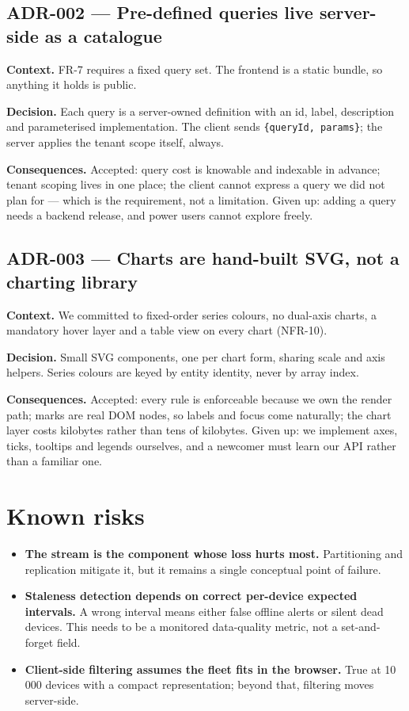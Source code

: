 \documentclass[11pt,a4paper]{article}
\begin{document}
\subsection*{ADR-002 --- Pre-defined queries live server-side as a catalogue}

\textbf{Context.} FR-7 requires a fixed query set. The frontend is a static bundle, so
anything it holds is public.

\textbf{Decision.} Each query is a server-owned definition with an id, label,
description and parameterised implementation. The client sends
\texttt{\{queryId, params\}}; the server applies the tenant scope itself, always.

\textbf{Consequences.} Accepted: query cost is knowable and indexable in advance;
tenant scoping lives in one place; the client cannot express a query we did not plan
for --- which is the requirement, not a limitation. Given up: adding a query needs a
backend release, and power users cannot explore freely.

\subsection*{ADR-003 --- Charts are hand-built SVG, not a charting library}

\textbf{Context.} We committed to fixed-order series colours, no dual-axis charts, a
mandatory hover layer and a table view on every chart (NFR-10).

\textbf{Decision.} Small SVG components, one per chart form, sharing scale and axis
helpers. Series colours are keyed by entity identity, never by array index.

\textbf{Consequences.} Accepted: every rule is enforceable because we own the render
path; marks are real DOM nodes, so labels and focus come naturally; the chart layer
costs kilobytes rather than tens of kilobytes. Given up: we implement axes, ticks,
tooltips and legends ourselves, and a newcomer must learn our API rather than a
familiar one.

\section{Known risks}

\begin{itemize}
  \item \textbf{The stream is the component whose loss hurts most.} Partitioning and
        replication mitigate it, but it remains a single conceptual point of failure.
  \item \textbf{Staleness detection depends on correct per-device expected
        intervals.} A wrong interval means either false offline alerts or silent dead
        devices. This needs to be a monitored data-quality metric, not a
        set-and-forget field.
  \item \textbf{Client-side filtering assumes the fleet fits in the browser.} True at
        10\,000 devices with a compact representation; beyond that, filtering moves
        server-side.
\end{itemize}
\end{document}
